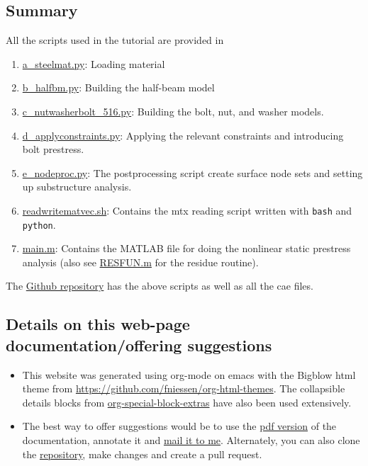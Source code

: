 \documentclass[11pt]{article}
\begin{document}
\subsection{Summary}
\label{sec:orgf9dc5b8}
All the scripts used in the tutorial are provided in 
\begin{enumerate}
\item \href{https://github.com/Nidish96/Abaqus4Joints/blob/main/scripts/a\_steelmat.py}{a\_steelmat.py}: Loading material
\item \href{https://github.com/Nidish96/Abaqus4Joints/blob/main/scripts/b\_halfbm.py}{b\_halfbm.py}: Building the half-beam model
\item \href{https://github.com/Nidish96/Abaqus4Joints/blob/main/scripts/c\_nutwasherbolt\_516.py}{c\_nutwasherbolt\_516.py}: Building the bolt, nut, and washer models.
\item \href{https://github.com/Nidish96/Abaqus4Joints/blob/main/scripts/d\_applyconstraints.py}{d\_applyconstraints.py}: Applying the relevant constraints and introducing bolt prestress.
\item \href{https://github.com/Nidish96/Abaqus4Joints/blob/main/scripts/e\_nodeproc.py}{e\_nodeproc.py}: The postprocessing script create surface node sets and setting up substructure analysis.
\item \href{https://github.com/Nidish96/Abaqus4Joints/blob/main/scripts/readwritematvec.sh}{readwritematvec.sh}: Contains the mtx reading script written with \texttt{bash} and \texttt{python}.
\item \href{https://github.com/Nidish96/Abaqus4Joints/blob/main/assets/demo/main.m}{main.m}: Contains the MATLAB file for doing the nonlinear static prestress analysis (also see \href{https://github.com/Nidish96/Abaqus4Joints/blob/main/assets/demo/RESFUN.m}{RESFUN.m} for the residue routine).
\end{enumerate}

The \href{https://github.com/Nidish96/Abaqus4Joints}{Github repository} has the above scripts as well as all the cae files.
\subsection{Details on this web-page documentation/offering suggestions}
\label{sec:org45b8331}
\begin{itemize}
\item This website was generated using org-mode on emacs with the Bigblow html theme from \href{https://github.com/fniessen/org-html-themes}{https://github.com/fniessen/org-html-themes}.
The collapsible details blocks from \href{https://github.com/alhassy/org-special-block-extras}{org-special-block-extras} have also been used extensively.
\item The best way to offer suggestions would be to use the \href{https://github.com/Nidish96/Abaqus4Joints/blob/main/docs/index.pdf}{pdf version} of the documentation, annotate it and \href{mailto:nidish.balaji@ila.uni-stuttgart.de}{mail it to me}.
Alternately, you can also clone the \href{https://github.com/Nidish96/Abaqus4Joints}{repository}, make changes and create a pull request.
\end{itemize}
\end{document}
